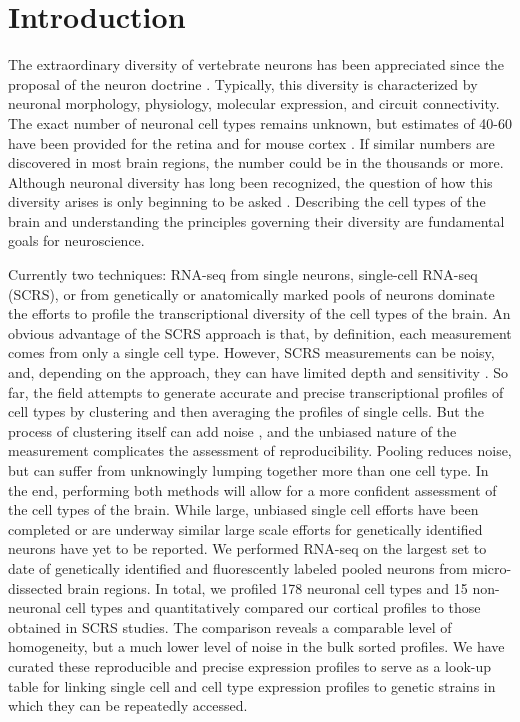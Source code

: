 \section*{Introduction}

The extraordinary diversity of vertebrate neurons has been appreciated since the proposal of the neuron doctrine \citep{0195074017}. Typically, this diversity is characterized by neuronal morphology, physiology, molecular expression, and circuit connectivity. The exact number of neuronal cell types remains unknown, but estimates of 40-60 have been provided for the retina \citep{Macosko_2015,Masland_2004} and for mouse cortex \citep{Tasic_2016,Zeisel_2015}. If similar numbers are discovered in most brain regions, the number could be in the thousands or more. Although neuronal diversity has long been recognized, the question of how this diversity arises is only beginning to be asked \citep{Arendt_2008,Muotri_2006}. Describing the cell types of the brain and understanding the principles governing their diversity are fundamental goals for neuroscience.

Currently two techniques: RNA-seq from single neurons, single-cell RNA-seq (SCRS), \citep[e.g.][]{Shapiro_2013} or from genetically or anatomically marked pools of neurons \citep[e.g.][]{Okaty_2015,Cembrowski_2016} dominate the efforts to profile the transcriptional diversity of the cell types of the brain. An obvious advantage of the SCRS approach is that, by definition, each measurement comes from only a single cell type. However, SCRS measurements can be noisy, and, depending on the approach, they can have limited depth and sensitivity \citep{Parekh_2016,Svensson_2017}. So far, the field attempts to generate accurate and precise transcriptional profiles of cell types by clustering and then averaging the profiles of single cells. But the process of clustering itself can add noise \citep{Ntranos_2016}, and the unbiased nature of the measurement complicates the assessment of reproducibility. Pooling reduces noise, but can suffer from unknowingly lumping together more than one cell type. In the end, performing both methods will allow for a more confident assessment of the cell types of the brain. While large, unbiased single cell efforts have been completed or are underway similar large scale efforts for genetically identified neurons have yet to be reported. We performed RNA-seq on the largest set to date of genetically identified and fluorescently labeled pooled neurons from micro-dissected brain regions. In total, we profiled 178 neuronal cell types and 15 non-neuronal cell types and quantitatively compared our cortical profiles to those obtained in SCRS studies. The comparison reveals a comparable level of homogeneity, but a much lower level of noise in the bulk sorted profiles. We have curated these reproducible and precise expression profiles to serve as a look-up table for linking single cell and cell type expression profiles to genetic strains in which they can be repeatedly accessed. 

